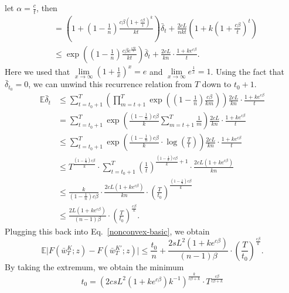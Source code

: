 let $\alpha = \frac{c}{t}$, then
  \begin{equation}
 \begin{aligned}
     &= \left(1+(1-\frac{1}{n})\frac{c\beta(1+\frac{c\beta}{t})^{k}}{kt}\right) \bar{\delta}_{t} + \frac{2cL}{nkt}\left(1+k(1+\frac{c\beta}{t})^{t}\right)\\
     &\leq \exp\left((1-\frac{1}{n})\frac{c\beta e^{\frac{c\beta k}{t}}}{kt}\right) \bar{\delta}_{t} + \frac{2cL}{kn}\cdot\frac{1+k e^{c\beta}}{t}.
    \end{aligned}
   \end{equation}
Here we used that $\lim\limits_{x\to\infty}(1+\frac{1}{x})^x=e$ and $\lim\limits_{x\to\infty}e^\frac{1}{x}=1$. 
Using the fact that $\bar{\delta}_{t_0}=0$, we can unwind this recurrence relation from $T$ down to $t_0+1$.
  \begin{equation}
    \begin{aligned}
     \mathbb{E}\bar{\delta}_{t} &\leq \sum_{t=t_0 +1}^{T} \left( \prod_{m=t+1}^{T}\exp\left((1-\frac{1}{n})\frac{c\beta}{km}\right)\right)\frac{2cL}{kn}\cdot\frac{1+k e^{c\beta}}{t}\\
     &= \sum_{t=t_0 +1}^{T} \exp\left(\frac{(1-\frac{1}{n})c\beta}{k} \sum_{m=t+1}^{T}\frac{1}{m}\right)\frac{2cL}{kn}\cdot\frac{1+k e^{c\beta}}{t}\\
     &\leq \sum_{t=t_0 +1}^{T} \exp\left( \frac{(1-\frac{1}{n})c\beta}{k} \cdot \log(\frac{T}{t}) \right)\frac{2cL}{kn}\cdot\frac{1+k e^{c\beta}}{t}\\
     &\leq T^{\frac{(1-\frac{1}{n})c\beta}{k}} \cdot \sum_{t=t_0 +1}^{T} \left(\frac{1}{t}\right)^{\frac{(1-\frac{1}{n})c\beta}{k}+1} \cdot \frac{2cL(1+ke^{c\beta})}{kn}\\
     &\leq \frac{k}{(1-\frac{1}{n})c\beta} \cdot \frac{2cL(1+ke^{c\beta})}{kn} \cdot \left(\frac{T}{t_0}\right)^{\frac{(1-\frac{1}{n})c\beta}{k}}\\
     &\leq \frac{2L(1+ke^{c\beta})}{(n-1)\beta} \cdot \left(\frac{T}{t_0}\right)^{\frac{c\beta}{k}}.
    \end{aligned}
   \end{equation}
Plugging this back into Eq.~\eqref{nonconvex-basic}, we obtain
 \begin{equation}\label{with-con}
  \mathbb{E}\vert F(\bar{w}_T^{K};z)-F(\bar{w}^{K\prime}_T;z)\vert \leq \frac{t_0}{n} + \frac{2sL^2(1+ke^{c\beta})}{(n-1)\beta} \cdot \left(\frac{T}{t_0}\right)^{\frac{c\beta}{k}}.
 \end{equation}
By taking the extremum, we obtain the minimum  
 \begin{equation}\label{with-con-t_0}
    t_0 = \left(2csL^2(1+ke^{c\beta})k^{-1}\right)^{\frac{k}{c\beta+k}}\cdot T^{\frac{c\beta}{c\beta+k}}
   \end{equation}
